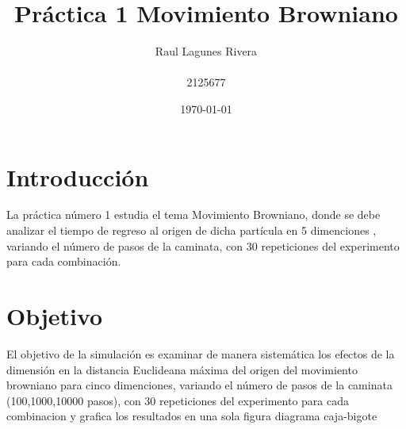 \documentclass{article}
\author{Raul Lagunes Rivera \\\\2125677} %
\title{Pr\'{a}ctica 1 Movimiento Browniano}%
\date{\today}
\begin{document}

\maketitle %


\section{Introducci\'{o}n}\label{intro} %



La  pr\'{a}ctica n\'{u}mero 1  estudia el tema Movimiento Browniano, donde se debe analizar el tiempo de regreso al origen de dicha part\'{i}cula en 5 dimenciones , variando el n\'{u}mero de pasos de la caminata, con 30 repeticiones del experimento para cada combinaci\'{o}n\citep{ejemplo}.

\section{Objetivo}
El objetivo de la simulaci\'{o}n es examinar de manera sistem\'{a}tica los efectos de la dimensi\'{o}n en la distancia Euclideana m\'{a}xima del origen del movimiento browniano para cinco dimenciones, variando el n\'{u}mero de pasos de la caminata (100,1000,10000 pasos), con 30 repeticiones del experimento para cada combinacion y grafica los resultados en una sola figura diagrama caja-bigote
\end{document}
